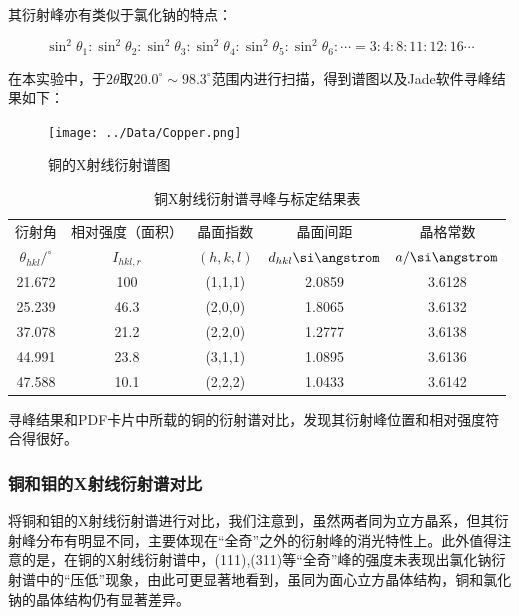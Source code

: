 \documentclass{thuemp}
\begin{document}
其衍射峰亦有类似于氯化钠的特点：

\begin{equation}
    \sin^2\theta_1 : \sin^2\theta_2: \sin^2\theta_3 : \sin^2\theta_4 : \sin^2\theta_5 : \sin^2\theta_6 : \cdots =
    3 : 4 : 8 : 11 : 12: 16 \cdots
    \label{eq:cu_diff_patt}
\end{equation}

在本实验中，于$2\theta$取$20.0^\circ \sim 98.3^\circ$范围内进行扫描，得到谱图以及Jade软件寻峰结果如下：

\begin{figure}[H]
    \centering
    \texttt{[image: ../Data/Copper.png]}
    \caption{铜的X射线衍射谱图}
    \label{fig:cu_xrd}
\end{figure}

\begin{table}
    \centering
    \captionnamefont{\wuhao\bf\heiti}
    \captiontitlefont{\wuhao\bf\heiti}
    \caption{铜X射线衍射谱寻峰与标定结果表}
    \label{tab:cu_xrd}
    \liuhao
    \begin{tabular}{ccccc}
        \toprule
        衍射角 & 相对强度（面积）& 晶面指数 & 晶面间距 & 晶格常数 \\
        $\theta_{hkl}/^\circ$ & $I_{hkl,r}$ & $(h,k,l)$ & $d_{hkl}\text{\si\angstrom}$ & $a/\text{\si\angstrom}$\\
        \midrule
        21.672 &  100 & (1,1,1) & 2.0859 & 3.6128 \\
        25.239 & 46.3 & (2,0,0) & 1.8065 & 3.6132 \\
        37.078 & 21.2 & (2,2,0) & 1.2777 & 3.6138 \\
        44.991 & 23.8 & (3,1,1) & 1.0895 & 3.6136 \\
        47.588 & 10.1 & (2,2,2) & 1.0433 & 3.6142 \\
        \bottomrule
    \end{tabular}
\end{table}

寻峰结果和PDF卡片中所载的铜的衍射谱对比，发现其衍射峰位置和相对强度符合得很好。

\subsubsection{铜和钼的X射线衍射谱对比}

将铜和钼的X射线衍射谱进行对比，我们注意到，虽然两者同为立方晶系，但其衍射峰分布有明显不同，主要体现在“全奇”之外的衍射峰的消光特性上。此外值得注意的是，在铜的X射线衍射谱中，(111),(311)等“全奇”峰的强度未表现出氯化钠衍射谱中的“压低”现象，由此可更显著地看到，虽同为面心立方晶体结构，铜和氯化钠的晶体结构仍有显著差异。
\end{document}
